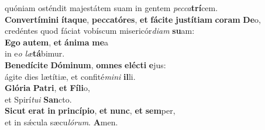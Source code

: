 \evenverse quóniam osténdit majestátem suam in gentem \textit{pec}\textit{ca}\textbf{trí}cem.\\
\oddverse \textbf{Con}\textbf{ver}\textbf{tí}\textbf{mi}\textbf{ni} \textbf{í}\textbf{ta}\textbf{que}, \textbf{pec}\textbf{ca}\textbf{tó}\textbf{res}, \textbf{et} \textbf{fá}\textbf{ci}\textbf{te} \textbf{ju}\textbf{stí}\textbf{ti}\textbf{am} \textbf{co}\textbf{ram} \textbf{De}o,~\*\\
\oddverse credéntes quod fáciat vobíscum misericór\textit{di}\textit{am} \textbf{su}am:\\
\evenverse \textbf{E}\textbf{go} \textbf{au}\textbf{tem}, \textbf{et} \textbf{á}\textbf{ni}\textbf{ma} \textbf{me}a~\*\\
\evenverse in e\textit{o} \textit{læ}\textbf{tá}bimur.\\
\oddverse \textbf{Be}\textbf{ne}\textbf{dí}\textbf{ci}\textbf{te} \textbf{Dó}\textbf{mi}\textbf{num}, \textbf{om}\textbf{nes} \textbf{e}\textbf{lé}\textbf{cti} \textbf{e}jus:~\*\\
\oddverse ágite dies lætítiæ, et confité\textit{mi}\textit{ni} \textbf{il}li.\\
\evenverse \textbf{Gló}\textbf{ri}\textbf{a} \textbf{Pa}\textbf{tri}, \textbf{et} \textbf{Fí}\textbf{li}o,~\*\\
\evenverse et Spirí\textit{tu}\textit{i} \textbf{San}cto.\\
\oddverse \textbf{Si}\textbf{cut} \textbf{e}\textbf{rat} \textbf{in} \textbf{prin}\textbf{cí}\textbf{pi}\textbf{o}, \textbf{et} \textbf{nunc}, \textbf{et} \textbf{sem}per,~\*\\
\oddverse et in sǽcula sæcu\textit{ló}\textit{rum}. \textbf{A}men.\\
